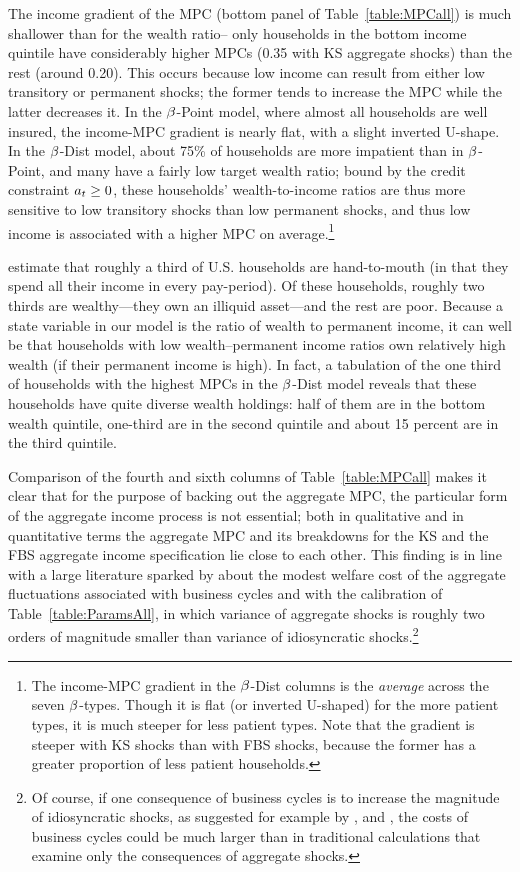 \documentclass[12pt,titlepage]{econtex}
\begin{document}
The income gradient of the MPC (bottom panel of Table~\ref{table:MPCall}) is much shallower than for the wealth ratio-- only households in the bottom income quintile have considerably higher MPCs (0.35 with KS aggregate shocks) than the rest (around 0.20).  This occurs because low income can result from either low transitory or permanent shocks; the former tends to increase the MPC while the latter decreases it.  In the $\beta$-Point model, where almost all households are well insured, the income-MPC gradient is nearly flat, with a slight inverted U-shape.  In the $\beta$-Dist model, about 75\% of households are more impatient than in $\beta$-Point, and many have a fairly low target wealth ratio; bound by the credit constraint $a_t \geq 0$, these households' wealth-to-income ratios are thus more sensitive to low transitory shocks than low permanent shocks, and thus low income is associated with a higher MPC on average.\footnote{The income-MPC gradient in the $\beta$-Dist columns is the \textit{average} across the seven $\beta$-types.  Though it is flat (or inverted U-shaped) for the more patient types, it is much steeper for less patient types.  Note that the gradient is steeper with KS shocks than with FBS shocks, because the former has a greater proportion of less patient households.}

\cite{kaplanViolanteWeidner_wealthyH2M} estimate that roughly a third of U.S. households are hand-to-mouth (in that they spend all their income in every pay-period). Of these households, roughly two thirds are wealthy---they own an illiquid asset---and the rest are poor. Because a state variable in our model is the ratio of wealth to permanent income, it can well be that households with low wealth--permanent income ratios own relatively high wealth (if their permanent income is high). In fact, a tabulation of the one third of households with the highest MPCs in the $\beta$-Dist model reveals that these households have quite diverse wealth holdings: half of them are in the bottom wealth quintile, one-third are in the second quintile and about 15 percent are in the third quintile.

Comparison of the fourth and sixth columns of Table~\ref{table:MPCall} makes it clear that for the purpose of
backing out the aggregate MPC, the particular form of the aggregate
income process is not essential; both in qualitative and in
quantitative terms the aggregate MPC and its breakdowns for the KS and
the FBS aggregate income specification lie close to each other.  This
finding is in line with a large literature sparked by
\citet{lucasBusinessCycles} about the modest welfare cost of the
aggregate fluctuations associated with business cycles and with the
calibration of Table~\ref{table:ParamsAll}, in which variance of
aggregate shocks is roughly two orders of magnitude smaller than
variance of idiosyncratic shocks.\footnote{Of course, if one consequence of
business cycles is to increase the magnitude of idiosyncratic shocks,
as suggested for example by \cite{mcKayPapp:wageRiskOverBC}, \cite{gosCyclical} and \cite{Blundell:2013tm}, the costs of business cycles could be much larger than in traditional calculations that
examine only the consequences of aggregate shocks.}
\end{document}
